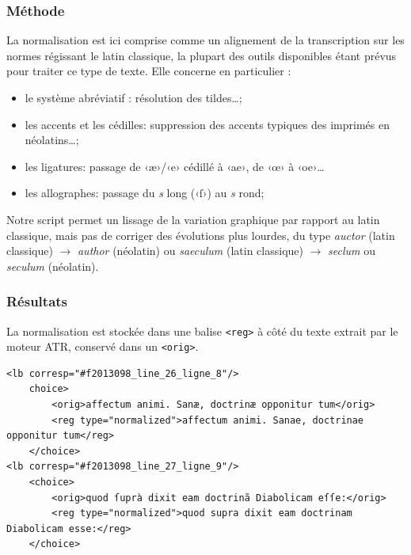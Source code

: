 \documentclass[final, fra]{anthology-ch}      %
\begin{document}
\subsubsection{Méthode}

La normalisation est ici comprise comme un alignement de la transcription sur les normes régissant le latin classique, la plupart des outils disponibles étant prévus pour traiter ce type de texte. Elle concerne en particulier : 

\begin{itemize}
    \item le système abréviatif : résolution des tildes…;
    \item les accents et les cédilles: suppression des accents typiques des imprimés en néolatins…; 
    \item les ligatures: passage de ‹æ›/‹e› cédillé à ‹ae›, de ‹œ› à ‹oe›…
    \item les allographes: passage du \textit{s} long (‹ſ›) au \textit{s} rond;
\end{itemize}

Notre script permet un lissage de la variation graphique par rapport au latin classique, mais pas de corriger des évolutions plus lourdes, du type \textit{auctor} (latin classique) $\to$ \textit{author} (néolatin) ou \textit{saeculum} (latin classique) $\to$ \textit{seclum} ou \textit{seculum} (néolatin).

\subsubsection{Résultats}

La normalisation est stockée dans une balise \texttt{<reg>} à côté du texte extrait par le moteur ATR, conservé dans un \texttt{<orig>}.

\begin{verbatim}
<lb corresp="#f2013098_line_26_ligne_8"/>
    choice>
        <orig>affectum animi. Sanæ, doctrinæ opponitur tum</orig>
        <reg type="normalized">affectum animi. Sanae, doctrinae opponitur tum</reg>
    </choice>
<lb corresp="#f2013098_line_27_ligne_9"/>
    <choice>
        <orig>quod ſuprà dixit eam doctrinã Diabolicam eſſe:</orig>
        <reg type="normalized">quod supra dixit eam doctrinam Diabolicam esse:</reg>
    </choice>
\end{verbatim}
\end{document}
